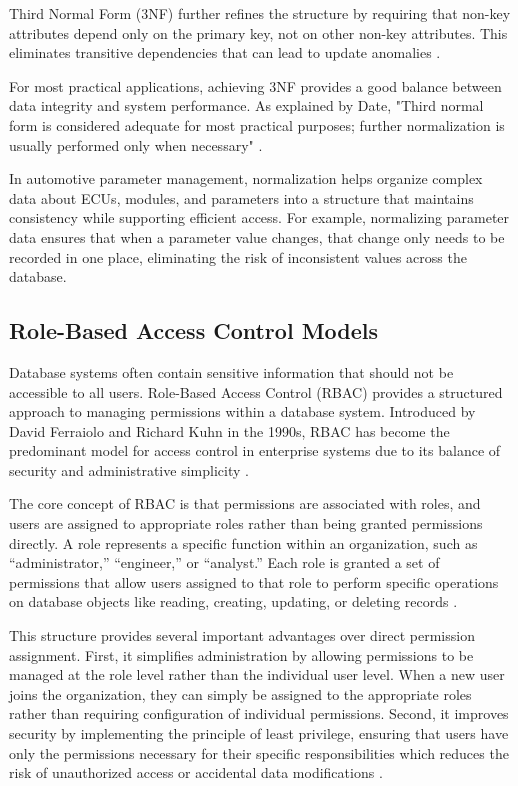 Third Normal Form (3NF) further refines the structure by requiring that non-key attributes depend only on the primary key, not on other non-key attributes. This eliminates transitive dependencies that can lead to update anomalies \cite{elmasri2015fundamentals}.

For most practical applications, achieving 3NF provides a good balance between data integrity and system performance. As explained by Date, "Third normal form is considered adequate for most practical purposes; further normalization is usually performed only when necessary" \cite{date2011sql}.

In automotive parameter management, normalization helps organize complex data about \acp{ECU}, modules, and parameters into a structure that maintains consistency while supporting efficient access. For example, normalizing parameter data ensures that when a parameter value changes, that change only needs to be recorded in one place, eliminating the risk of inconsistent values across the database.

\subsection{Role-Based Access Control Models}
\label{subsec:role-based-access-control}

Database systems often contain sensitive information that should not be accessible to all users. Role-Based Access Control (RBAC) provides a structured approach to managing permissions within a database system. Introduced by David Ferraiolo and Richard Kuhn in the 1990s, RBAC has become the predominant model for access control in enterprise systems due to its balance of security and administrative simplicity \cite{sandhu1998role}.

The core concept of RBAC is that permissions are associated with roles, and users are assigned to appropriate roles rather than being granted permissions directly. A role represents a specific function within an organization, such as ``administrator,'' ``engineer,'' or ``analyst.'' Each role is granted a set of permissions that allow users assigned to that role to perform specific operations on database objects like reading, creating, updating, or deleting records \cite{ferraiolo2011policy}.

This structure provides several important advantages over direct permission assignment. First, it simplifies administration by allowing permissions to be managed at the role level rather than the individual user level. When a new user joins the organization, they can simply be assigned to the appropriate roles rather than requiring configuration of individual permissions. Second, it improves security by implementing the principle of least privilege, ensuring that users have only the permissions necessary for their specific responsibilities which reduces the risk of unauthorized access or accidental data modifications \cite{sandhu1998role}.

